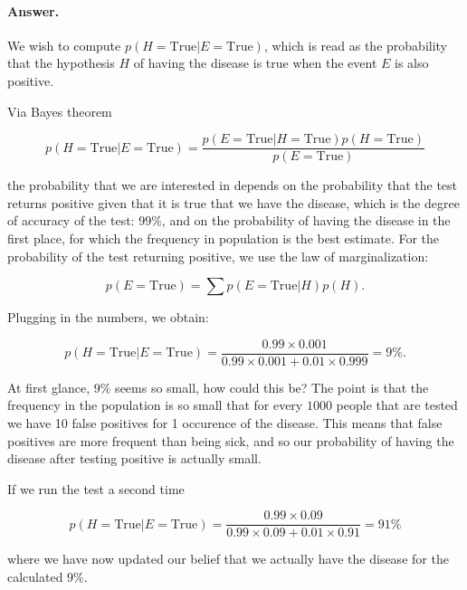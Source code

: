 \documentclass[12pt]{article}
\begin{document}
\paragraph{Answer.}
We wish to compute $p( H = \mathrm{True} | E = \mathrm{True} )$, which is read as
the probability that the hypothesis $H$ of having the disease is true when the event $E$ is also positive.

Via Bayes theorem 

\begin{equation}
p ( H = \mathrm{True} | E = \mathrm{True} ) = \frac{ p( E = \mathrm{True} | H = \mathrm{True} ) p ( H = \mathrm{True} ) } { p ( E = \mathrm{True} ) }
\end{equation}

\noindent
the probability that we are interested in depends on the probability that the test returns positive given that it is true
that we have the disease, which is the degree of accuracy of the test: $99\%$, and on the probability of having the disease 
in the first place, for which the frequency in population is the best estimate.
For the probability of the test returning positive, we use the law of marginalization:

\begin{equation}
p( E = \mathrm{True} ) = \sum p ( E = \mathrm{True} | H ) p (H).
\end{equation}

Plugging in the numbers, we obtain:

\begin{equation}
p ( H = \mathrm{True} | E = \mathrm{True} ) = 
\frac{ 0.99 \times 0.001 }{ 0.99 \times 0.001 + 0.01 \times 0.999 } = 9 \% .
\end{equation}

\noindent
At first glance, $9\%$ seems so small, how could this be?
The point is that the frequency in the population is so small that for every $1000$ people
that are tested we have 10 false positives for 1 occurence of the disease.
This means that false positives are more frequent than being sick, and so our probability of 
having the disease after testing positive is actually small.

If we run the test a second time 

\begin{equation}
p ( H = \mathrm{True} | E = \mathrm{True} ) = 
\frac{ 0.99 \times 0.09 }{ 0.99 \times 0.09 + 0.01 \times 0.91 } = 91 \% 
\end{equation}

\noindent
where we have now updated our belief that we actually have the disease for the calculated $9 \%$.
\end{document}
